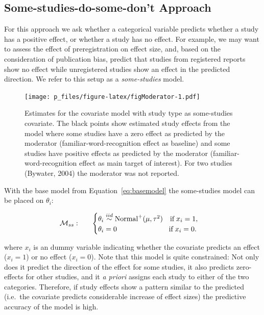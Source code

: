 \documentclass[english,,man]{apa6}
\begin{document}
\hypertarget{some-studies-do-some-dont-approach}{%
\subsection{Some-studies-do-some-don't Approach}\label{some-studies-do-some-dont-approach}}

For this approach we ask whether a categorical variable predicts whether a study has a positive effect, or whether a study has no effect. For example, we may want to assess the effect of preregistration on effect size, and, based on the consideration of publication bias, predict that studies from registered reports show no effect while unregistered studies show an effect in the predicted direction. We refer to this setup as a \emph{some-studies} model.

\begin{figure}
\centering
\texttt{[image: p\_files/figure-latex/figModerator-1.pdf]}
\caption{\label{fig:figModerator}Estimates for the covariate model with study type as some-studies covariate. The black points show estimated study effects from the model where some studies have a zero effect as predicted by the moderator (familiar-word-recognition effect as baseline) and some studies have positive effects as predicted by the moderator (familiar-word-recognition effect as main target of interest). For two studies (Bywater, 2004) the moderator was not reported.}
\end{figure}

With the base model from Equation~\eqref{eq:basemodel} the some-studies model can be placed on \(\theta_i\):

\[
\begin{array}{llr}
{\cal M}_{ss}: && \begin{cases}
\theta_i \stackrel{iid}{\sim} \mbox{Normal}^+(\mu,\tau^2) \quad \mbox{if} \; x_i = 1,\\
\theta_i = 0 \quad \quad \quad \quad \quad \quad \quad \; \mbox{if} \; x_i = 0.
\end{cases}
\end{array}
\]

where \(x_i\) is an dummy variable indicating whether the covariate predicts an effect (\(x_i = 1\)) or no effect (\(x_i = 0\)). Note that this model is quite constrained: Not only does it predict the direction of the effect for some studies, it also predicts zero-effects for other studies, and it \emph{a priori} assigns each study to either of the two categories. Therefore, if study effects show a pattern similar to the predicted (i.e.~the covariate predicts considerable increase of effect sizes) the predictive accuracy of the model is high.
\end{document}
